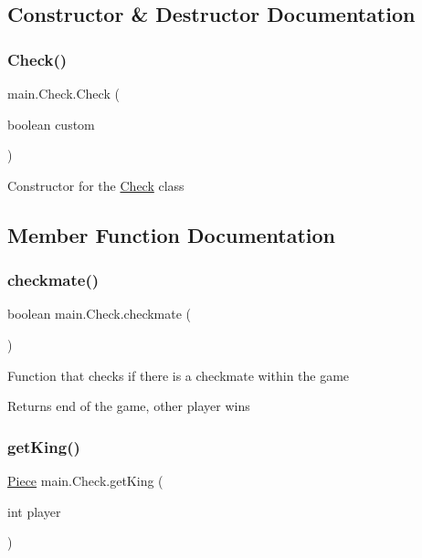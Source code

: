 \subsection{Constructor \& Destructor Documentation}
\mbox{\label{classmain_1_1_check_ad50f8884f3ccd0b8dfd3b5f55f3ba08b}} 
\subsubsection{\texorpdfstring{Check()}{Check()}}
{\footnotesize\ttfamily main.\+Check.\+Check (\begin{DoxyParamCaption}\item[{boolean}]{custom }\end{DoxyParamCaption})}

Constructor for the \hyperlink{classmain_1_1_check}{Check} class 

\subsection{Member Function Documentation}
\mbox{\label{classmain_1_1_check_a6a22c24f1a038324813439e17bc92390}} 
\subsubsection{\texorpdfstring{checkmate()}{checkmate()}}
{\footnotesize\ttfamily boolean main.\+Check.\+checkmate (\begin{DoxyParamCaption}{ }\end{DoxyParamCaption})}

Function that checks if there is a checkmate within the game \begin{DoxyReturn}{Returns}
end of the game, other player wins 
\end{DoxyReturn}
\mbox{\label{classmain_1_1_check_a4c11e37a69b51afe8318b6cd99bfbe19}} 
\subsubsection{\texorpdfstring{get\+King()}{getKing()}}
{\footnotesize\ttfamily \hyperlink{classmain_1_1_piece}{Piece} main.\+Check.\+get\+King (\begin{DoxyParamCaption}\item[{int}]{player }\end{DoxyParamCaption})}

